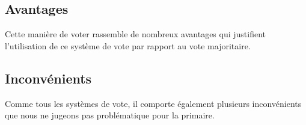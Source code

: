 \documentclass[conference]{IEEEtran}
\begin{document}
\subsection{Avantages}

Cette mani\`ere de voter rassemble de nombreux avantages qui justifient l'utilisation de ce syst\`eme de vote par rapport au vote majoritaire.



\subsection{Inconv\'enients}

Comme tous les syst\`emes de vote, il comporte \'egalement plusieurs inconv\'enients que nous ne jugeons pas probl\'ematique pour la primaire.
\end{document}
